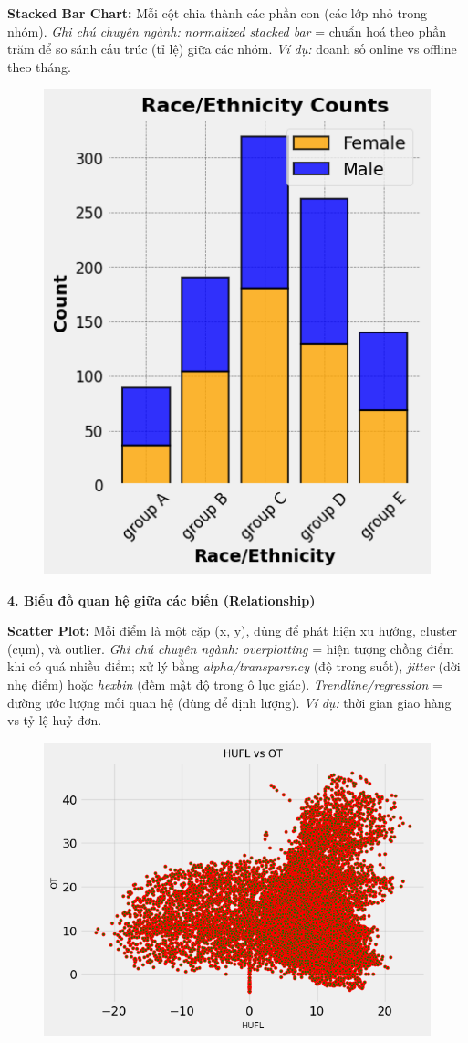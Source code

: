\documentclass[11pt]{article}
\begin{document}
\medskip
\textbf{Stacked Bar Chart:} Mỗi cột chia thành các phần con (các lớp nhỏ trong nhóm).
\textit{Ghi chú chuyên ngành:} \emph{normalized stacked bar} = chuẩn hoá theo phần trăm để so sánh cấu trúc (tỉ lệ) giữa các nhóm.
\textit{Ví dụ:} doanh số online vs offline theo tháng.
\begin{figure}[H]
    \centering
    \includegraphics[height=0.4\textheight]{images/stackedBarC.png}
\end{figure}

\medskip
\noindent \textbf{4. Biểu đồ quan hệ giữa các biến (Relationship)}

\medskip
\textbf{Scatter Plot:} Mỗi điểm là một cặp (x, y), dùng để phát hiện xu hướng, cluster (cụm), và outlier.
\textit{Ghi chú chuyên ngành:} \emph{overplotting} = hiện tượng chồng điểm khi có quá nhiều điểm; xử lý bằng \emph{alpha/transparency} (độ trong suốt), \emph{jitter} (dời nhẹ điểm) hoặc \emph{hexbin} (đếm mật độ trong ô lục giác). \emph{Trendline/regression} = đường ước lượng mối quan hệ (dùng để định lượng).
\textit{Ví dụ:} thời gian giao hàng vs tỷ lệ huỷ đơn.
\begin{figure}[H]
    \centering
    \includegraphics[width=0.5\linewidth]{images/ScatterC.png}
\end{figure}
\end{document}
